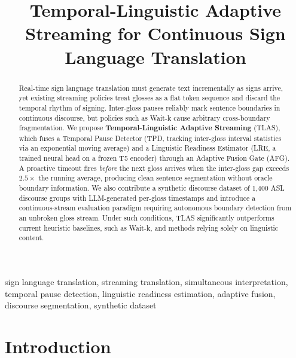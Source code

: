 \documentclass[conference]{IEEEtran}
\begin{document}
\title{Temporal-Linguistic Adaptive Streaming for Continuous Sign Language Translation}

\author{
}

\maketitle

\begin{abstract}
Real-time sign language translation must generate text incrementally as signs arrive, yet existing streaming policies treat glosses as a flat token sequence and discard the temporal rhythm of signing. Inter-gloss pauses reliably mark sentence boundaries in continuous discourse, but policies such as Wait-k cause arbitrary cross-boundary fragmentation. We propose \textbf{Temporal-Linguistic Adaptive Streaming} (TLAS), which fuses a Temporal Pause Detector (TPD, tracking inter-gloss interval statistics via an exponential moving average) and a Linguistic Readiness Estimator (LRE, a trained neural head on a frozen T5 encoder) through an Adaptive Fusion Gate (AFG). A proactive timeout fires \emph{before} the next gloss arrives when the inter-gloss gap exceeds $2.5\times$ the running average, producing clean sentence segmentation without oracle boundary information. We also contribute a synthetic discourse dataset of 1,400 ASL discourse groups with LLM-generated per-gloss timestamps and introduce a continuous-stream evaluation paradigm requiring autonomous boundary detection from an unbroken gloss stream. Under such conditions, TLAS significantly outperforms current heuristic baselines, such as Wait-k, and methods relying solely on linguistic content.
\end{abstract}

\begin{IEEEkeywords}
sign language translation, streaming translation, simultaneous interpretation, temporal pause detection, linguistic readiness estimation, adaptive fusion, discourse segmentation, synthetic dataset
\end{IEEEkeywords}

\section{Introduction}
\end{document}
